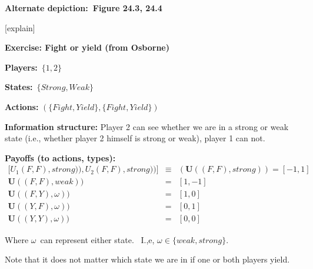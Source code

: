 \documentclass[handout]{beamer}
\begin{document}
\begin{frame}%

\textbf{Alternate depiction:\ Figure 24.3, 24.4}

[explain]\bigskip

\end{frame}%

\begin{frame}%

\textbf{Exercise: Fight or yield (from Osborne)}

\textbf{Players:}\ $\{1,2\}$

\textbf{States:}\ $\{Strong,Weak\}$

\textbf{Actions:} $(\{Fight,Yield\},\{Fight,Yield\})$

\pause%
\textbf{Information structure: }Player 2 can see whether we are in a strong
or weak state (i.e., whether player 2 himself is strong or weak), player 1
can not.\medskip

\pause%
\textbf{Payoffs (to actions, types):}%
\begin{eqnarray*}
\lbrack U_{1}(F,F),strong)),U_{2}(F,F),strong))] &\equiv &(\mathbf{U}%
((F,F),strong))=[-1,1] \\
\mathbf{U}((F,F),weak)) &=&[1,-1] \\
\mathbf{U}((F,Y),\omega )) &=&[1,0] \\
\mathbf{U}((Y,F),\omega )) &=&[0,1] \\
\mathbf{U}((Y,Y),\omega )) &=&[0,0]
\end{eqnarray*}

{\footnotesize Where }$\omega ${\footnotesize \ can represent either state.
\ I.,e, }$\omega \in \{weak,strong\}.$

{\footnotesize Note that it does not matter which state we are in if one or
both players yield.}

\end{frame}%
\end{document}
